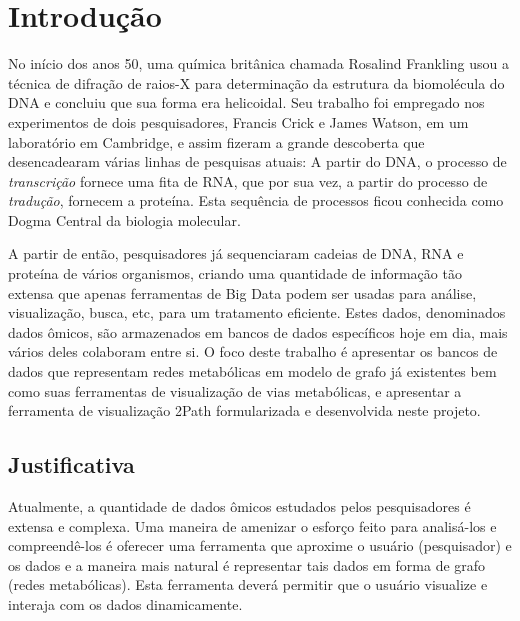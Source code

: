 \chapter*{Introdução}


\indent No início dos anos 50, uma química britânica chamada Rosalind Frankling usou a técnica de difração de raios-X para determinação da estrutura da biomolécula do DNA e concluiu que sua forma era helicoidal. Seu trabalho foi empregado nos experimentos de dois pesquisadores, Francis Crick e James Watson, em um laboratório em Cambridge, e assim fizeram a grande descoberta que desencadearam várias linhas de pesquisas atuais: A partir do DNA, o processo de \textit{transcrição} fornece uma fita de RNA, que por sua vez, a partir do processo de \textit{tradução}, fornecem a proteína. Esta sequência de processos ficou conhecida como Dogma Central da biologia molecular.


\indent A partir de então, pesquisadores já sequenciaram cadeias de DNA, RNA e proteína de vários organismos, criando uma quantidade de informação tão extensa que apenas ferramentas de Big Data podem ser usadas para análise, visualização, busca, etc, para um tratamento eficiente. Estes dados, denominados dados ômicos, são armazenados em bancos de dados específicos hoje em dia, mais vários deles colaboram entre si. O foco deste trabalho é apresentar os bancos de dados que representam redes metabólicas em modelo de grafo já existentes bem como suas ferramentas de visualização de vias metabólicas, e apresentar a ferramenta de visualização 2Path formularizada e desenvolvida neste projeto.





\section*{Justificativa}
\indent Atualmente, a quantidade de dados ômicos estudados pelos pesquisadores é extensa e complexa. Uma maneira de amenizar o esforço feito para analisá-los e compreendê-los é oferecer uma ferramenta que aproxime o usuário (pesquisador) e os dados e a maneira mais natural é representar tais dados em forma de grafo (redes metabólicas). Esta ferramenta deverá permitir que o usuário visualize e interaja com os dados dinamicamente.

